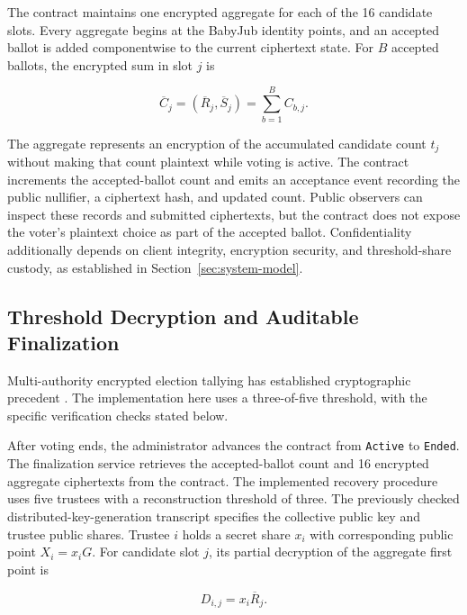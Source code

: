 The contract maintains one encrypted aggregate for each of the 16
candidate slots. Every aggregate begins at the BabyJub identity
points, and an accepted ballot is added componentwise to the current
ciphertext state. For $B$ accepted ballots, the encrypted sum in slot
$j$ is

\begin{equation}
\label{eq:protocol-aggregation}
\overline{C}_j=(\overline{R}_j,\overline{S}_j)
 =\sum_{b=1}^{B}C_{b,j}.
\end{equation}

The aggregate represents an encryption of the accumulated candidate
count $t_j$ without making that count plaintext while voting is active.
The contract increments the accepted-ballot count and emits an
acceptance event recording the public nullifier, a ciphertext hash, and
updated count. Public observers can inspect these records and submitted
ciphertexts, but the contract does not expose the voter's plaintext
choice as part of the accepted ballot. Confidentiality additionally
depends on client integrity, encryption security, and threshold-share
custody, as established in Section~\ref{sec:system-model}.

\subsection{Threshold Decryption and Auditable Finalization}
\label{subsec:architecture-finalization}
\label{subsec:protocol-threshold}
\label{subsec:protocol-finalization}

Multi-authority encrypted election tallying has established cryptographic precedent
\citep{cramer1997multiauthority}. The implementation here uses a
three-of-five threshold, with the specific verification checks stated below.

After voting ends, the administrator advances the contract from
\texttt{Active} to \texttt{Ended}. The finalization service retrieves
the accepted-ballot count and 16 encrypted aggregate ciphertexts from
the contract. The implemented recovery procedure uses five trustees
with a reconstruction threshold of three. The previously checked
distributed-key-generation transcript specifies the collective public
key and trustee public shares. Trustee $i$ holds a secret share $x_i$
with corresponding public point $X_i=x_iG$. For candidate slot $j$,
its partial decryption of the aggregate first point is

\begin{equation}
\label{eq:protocol-partial}
D_{i,j}=x_i\overline{R}_j.
\end{equation}

